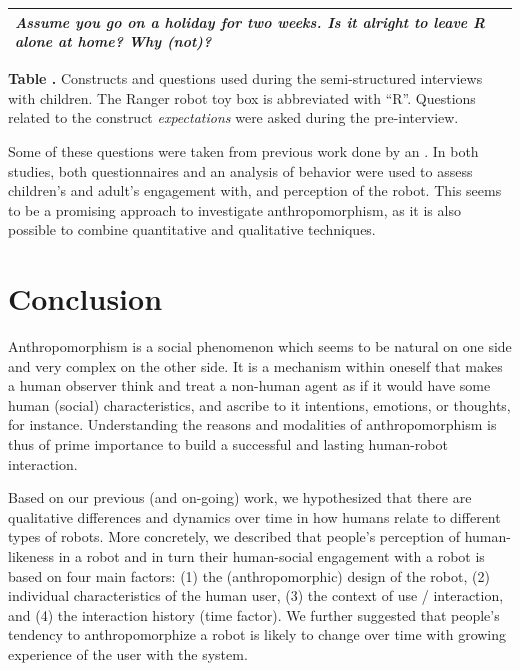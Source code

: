 \documentclass{frontiersSCNS} %
\begin{document}
\begin{table}
\begin{tabular}{lp{10cm}}
    \emph{Assume you go on a holiday for two weeks. Is it alright to leave R
    alone at home? Why (not)?}
    \\
    \bottomrule

    \end{tabular}

    \textbf{\label{tab:domino-questions}Table .} Constructs and questions used during the semi-structured interviews
    with children. The Ranger robot toy box is abbreviated with ``R''. Questions
    related to the construct \emph{expectations} were asked during the
    pre-interview.

     

\end{table}

Some of these questions were taken from previous work done by
\cite{kahn_jr._robotic_2006} an \cite{weiss_i_2009}. In both studies, both
questionnaires and an analysis of behavior were used to assess children's and
adult's engagement with, and perception of the robot. This seems to be a
promising approach to investigate anthropomorphism, as it is also possible to
combine quantitative and qualitative techniques. 

%
%
%
%
%
%

\section{Conclusion}
\label{sec:conclusion}

Anthropomorphism is a social phenomenon which seems to be natural on one side
and very complex on the other side. It is a mechanism within oneself that makes
a human observer think and treat a non-human agent as if it would have some
human (social) characteristics, and ascribe to it intentions, emotions, or
thoughts, for instance. Understanding the reasons and modalities of
anthropomorphism is thus of prime importance to build a successful and lasting
human-robot interaction.

Based on our previous (and on-going) work, we hypothesized that there are
qualitative differences and dynamics over time in how humans relate to different
types of robots. More concretely, we described that people's perception of
human-likeness in a robot and in turn their human-social engagement with a robot
is based on four main factors: (1) the (anthropomorphic) design of the robot,
(2) individual characteristics of the human user, (3) the context of use /
interaction, and (4) the interaction history (time factor). We further suggested
that people's tendency to anthropomorphize a robot is likely to change over time
with growing experience of the user with the system. 
\end{document}
